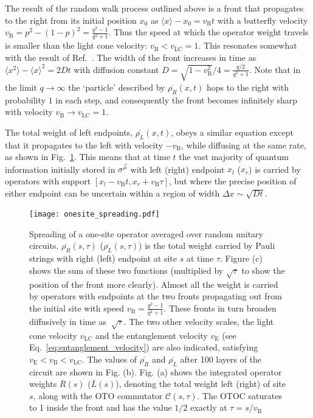 \documentclass[aps,prb,twocolumn,superscriptaddress]{revtex4-1}
\begin{document}
The result of the random walk process outlined above is a front that propagates to the right from its initial position $x_0$ as $\langle x\rangle - x_0 = v_{\text{B}} t$ with a butterfly velocity $v_{\text{B}} = p^2 - (1-p)^2 = \frac{q^2-1}{q^2+1}$. Thus the speed at which the operator weight travels is smaller than the light cone velocity: $v_{\text{B}} < v_\text{LC} = 1$. This resonates somewhat with the result of Ref.~. The width of the front increases in time as $\langle x^2 \rangle - \langle x\rangle^2 = 2Dt$ with diffusion constant $D = \sqrt{1-v_{\text{B}}^2} / 4 = \frac{q/2}{q^2 + 1}$. Note that in the limit $q\to\infty$ the `particle' described by $\overline{\rho_R}(x,t)$ hops to the right with probability $1$ in each step, and consequently the front becomes infinitely sharp with velocity $v_{\text{B}}\to v_\text{LC}=1$.

The total weight of left endpoints, $\overline{\rho_L}(x,t)$, obeys a similar equation except that it propagates to the left with velocity $-v_{\text{B}}$, while diffusing at the same rate, as shown in Fig.~\ref{fig:front_propagation}. This means that at time $t$ the vast majority of quantum information initially stored in $\sigma^{\vec{\mu}}$ with left (right) endpoint $x_l$ ($x_r$) is carried by operators with support $[x_l-v_{\text{B}}t,x_r+v_{\text{B}}\tau]$, but where the precise position of either endpoint can be uncertain within a region of width $\Delta x \sim \sqrt{D t}$.  
 \begin{figure}[h!]
 \centering
  	\texttt{[image: onesite\_spreading.pdf]} 
\caption{Spreading of a one-site operator averaged over random unitary circuits. $\overline{\rho_R}(s,\tau)$ ($\overline{\rho_L}(s,\tau)$) is the total weight carried by Pauli strings with right (left) endpoint at site $s$ at time $\tau$. Figure (c) shows the sum of these two functions (multiplied by $\sqrt{\tau}$ to show the position of the front more clearly). Almost all the weight is carried by operators with endpoints at the two fronts propagating out from the initial site with speed $v_{\text{B}} = \frac{q^2-1}{q^2+1}$. These fronts in turn broaden diffusively in time as $~\sqrt{\tau}$. The two other velocity scales, the light cone velocity $v_\text{LC}$ and the entanglement velocity $v_\text{E}$ (see Eq.~\eqref{eq:entanglement_velocity}) are also indicated, satisfying $v_\text{E} < v_{\text{B}} < v_\text{LC}$. The values of $\overline{\rho_R}$ and $\overline{\rho_L}$ after 100 layers of the circuit are shown in Fig. (b). Fig. (a) shows the integrated operator weights $\overline{R}(s)$ ($\overline{L}(s)$), denoting the total weight left (right) of site $s$, along with the OTO commutator $\mathcal{C}(s,\tau)$. The OTOC saturates to 1 inside the front and has the value $1/2$ exactly at $\tau = s/v_{\text{B}}$}
 \label{fig:front_propagation}
 \end{figure}
\end{document}

